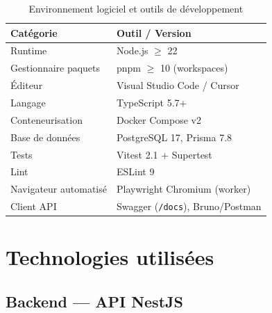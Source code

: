 \begin{table}[H]
\centering
\caption{Environnement logiciel et outils de développement}
\label{tab:logiciel}
\begin{tabularx}{\textwidth}{@{}p{4cm}X@{}}
\toprule
\textbf{Catégorie}       & \textbf{Outil / Version} \\
\midrule
\rowcolor{rowgray}
Runtime                  & Node.js $\geq$ 22 \\
Gestionnaire paquets     & pnpm $\geq$ 10 (workspaces) \\
\rowcolor{rowgray}
Éditeur                  & Visual Studio Code / Cursor \\
Langage                  & TypeScript 5.7+ \\
\rowcolor{rowgray}
Conteneurisation         & Docker Compose v2 \\
Base de données          & PostgreSQL 17, Prisma 7.8 \\
\rowcolor{rowgray}
Tests                    & Vitest 2.1 + Supertest \\
Lint                     & ESLint 9 \\
\rowcolor{rowgray}
Navigateur automatisé    & Playwright Chromium (worker) \\
Client API               & Swagger (\texttt{/docs}), Bruno/Postman \\
\bottomrule
\end{tabularx}
\end{table}

\section{Technologies utilisées}

\subsection{Backend — API NestJS}

